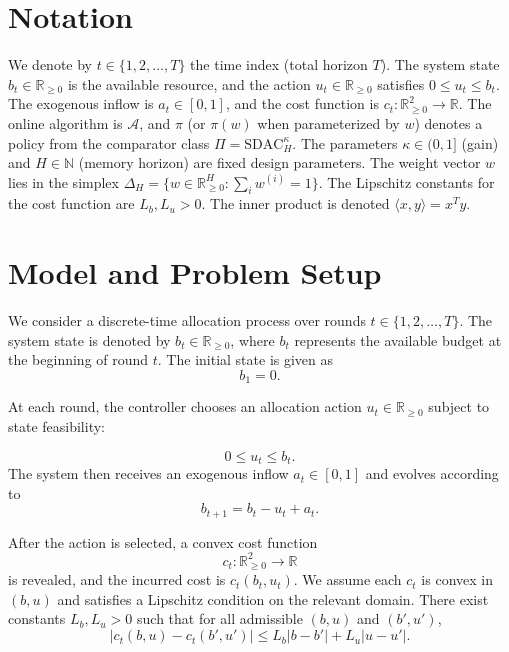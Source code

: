 \documentclass[11pt]{article}
\begin{document}
\section{Notation}
\label{sec:notation}

We denote by $t\in\{1,2,\ldots,T\}$ the time index (total horizon $T$). The system state $b_t\in\mathbb{R}_{\ge 0}$ is the available resource, and the action $u_t\in\mathbb{R}_{\ge 0}$ satisfies $0 \le u_t \le b_t$. The exogenous inflow is $a_t\in[0,1]$, and the cost function is $c_t:\mathbb{R}_{\ge 0}^2\to\mathbb{R}$. The online algorithm is $\mathcal{A}$, and $\pi$ (or $\pi(w)$ when parameterized by $w$) denotes a policy from the comparator class $\Pi = \mathrm{SDAC}_H^{\kappa}$. The parameters $\kappa\in(0,1]$ (gain) and $H\in\mathbb{N}$ (memory horizon) are fixed design parameters. The weight vector $w$ lies in the simplex $\Delta_H = \{w\in\mathbb{R}_{\ge 0}^H : \sum_i w^{(i)}=1\}$. The Lipschitz constants for the cost function are $L_b,L_u>0$. The inner product is denoted $\langle x,y\rangle = x^T y$.

\section{Model and Problem Setup}
\label{sec:model-setup}

We consider a discrete-time allocation process over rounds $t\in\{1,2,\ldots,T\}$. The system state is denoted by $b_t\in\mathbb{R}_{\ge 0}$, where $b_t$ represents the available budget at the beginning of round $t$. The initial state is given as
\[
b_1 = 0.
\]

At each round, the controller chooses an allocation action $u_t\in\mathbb{R}_{\ge 0}$ subject to state feasibility:

\begin{equation}
\label{eq:model-feasibility}
0 \le u_t \le b_t.
\end{equation}
The system then receives an exogenous inflow $a_t\in[0,1]$ and evolves according to
\begin{equation}
\label{eq:model-dynamics}
b_{t+1} = b_t - u_t + a_t.
\end{equation}

After the action is selected, a convex cost function
\[
c_t: \mathbb{R}_{\ge 0}^2 \to \mathbb{R}
\]
is revealed, and the incurred cost is $c_t(b_t,u_t)$. We assume each $c_t$ is convex in $(b,u)$ and satisfies a Lipschitz condition on the relevant domain. There exist constants $L_b,L_u>0$ such that for all admissible $(b,u)$ and $(b',u')$,
\begin{equation}
\label{eq:model-lipschitz}
|c_t(b,u)-c_t(b',u')| \le L_b|b-b'| + L_u|u-u'|.
\end{equation}
\end{document}
